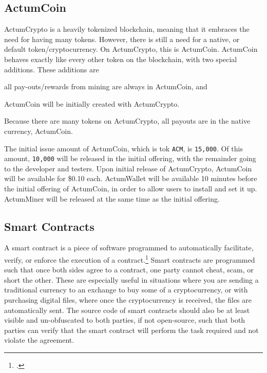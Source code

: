 \documentclass[letter]{article}
\begin{document}
\subsection{ActumCoin}
ActumCrypto is a heavily tokenized blockchain, meaning that it embraces the need for having many tokens. However, there is still a need for a native, or default token/cryptocurrency. On ActumCrypto, this is ActumCoin. ActumCoin behaves exactly like every other token on the blockchain, with two special additions. These additions are \begin{enumerate*}[label=(\alph*)]\item all pay-outs/rewards from mining are always in ActumCoin, and \item ActumCoin will be initially created with ActumCrypto.\end{enumerate*} Because there are many tokens on ActumCrypto, all payouts are in the native currency, ActumCoin.

The initial issue amount of ActumCoin, which is tok \texttt{ACM}, is \texttt{15,000}. Of this amount, \texttt{10,000} will be released in the initial offering, with the remainder going to the developer and testers. Upon initial release of ActumCrypto, ActumCoin will be available for \$0.10 each. ActumWallet will be available 10 minutes before the initial offering of ActumCoin, in order to allow users to install and set it up. ActumMiner will be released at the same time as the initial offering.

\subsection{Smart Contracts}
A smart contract is a piece of software programmed to automatically facilitate, verify, or enforce the execution of a contract.\footcite{smart_contract} Smart contracts are programmed such that once both sides agree to a contract, one party cannot cheat, scam, or short the other. These are especially useful in situations where you are sending a traditional currency to an exchange to buy some of a cryptocurrency, or with purchasing digital files, where once the cryptocurrency is received, the files are automatically sent. The source code of smart contracts should also be at least visible and un-obfuscated to both parties, if not open-source, such that both parties can verify that the smart contract will perform the task required and not violate the agreement.
\end{document}
